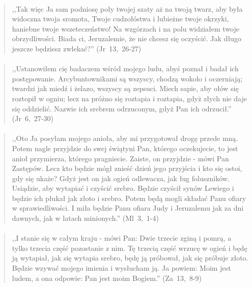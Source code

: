 \documentclass[10pt,a4paper,oneside]{article}
\begin{document}
\paragraph{}
\begin{quote}
,,Tak więc Ja sam podniosę poły twojej szaty aż na twoją twarz, aby była widoczna twoja sromota, Twoje cudzołóstwa i lubieżne twoje okrzyki, haniebne twoje wszeteczeństwo! Na wzgórzach i na polu widziałem twoje obrzydliwości. Biada ci, Jeruzalemie, że nie chcesz się oczyścić. Jak długo jeszcze będziesz zwlekać?'' \mbox{(Jr 13, 26-27)}
\end{quote}
\paragraph{}
\begin{quote}
,,Ustanowiłem cię badaczem wśród mojego ludu, abyś poznał i badał ich postępowanie. Arcybuntownikami są wszyscy, chodzą wokoło i oczerniają; twardzi jak miedź i żelazo, wszyscy są zepsuci. Miech sapie, aby ołów się roztopił w ogniu; lecz na próżno się roztapia i roztapia, gdyż złych nie daje się oddzielić. Nazwie ich srebrem odrzuconym, gdyż Pan ich odrzucił.'' \mbox{(Jr 6, 27-30)}
\end{quote}
\paragraph{}
\begin{quote}
,,Oto Ja posyłam mojego anioła, aby mi przygotował drogę przede mną. Potem nagle przyjdzie do swej świątyni Pan, którego oczekujecie, to jest anioł przymierza, którego pragniecie. Zaiste, on przyjdzie - mówi Pan Zastępów. Lecz kto będzie mógł znieść dzień jego przyjścia i kto się ostoi, gdy się ukaże? Gdyż jest on jak ogień odlewacza, jak ług foluszników. Usiądzie, aby wytapiać i czyścić srebro. Będzie czyścił synów Lewiego i będzie ich płukał jak złoto i srebro. Potem będą mogli składać Panu ofiary w sprawiedliwości. I miła będzie Panu ofiara Judy i Jeruzalemu jak za dni dawnych, jak w latach minionych.'' \mbox{(Ml 3, 1-4)}
\end{quote}
\paragraph{}
\begin{quote}
,,I stanie się w całym kraju - mówi Pan: Dwie trzecie zginą i pomrą, a tylko trzecia część pozostanie z nim. Tę trzecią część wrzucę w ogień i będę ją wytapiał, jak się wytapia srebro, będę ją próbował, jak się próbuje złoto. Będzie wzywać mojego imienia i wysłucham ją. Ja powiem: Moim jest ludem, a ona odpowie: Pan jest moim Bogiem.'' \mbox{(Za 13, 8-9)}
\end{quote}
\end{document}
